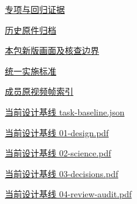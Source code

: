 \documentclass[11pt,a4paper]{article}
\begin{document}
\href{file:///D:/Agent/srp/agent/tasks/E-01/evidence/verification.json}{专项与回归证据}


\href{file:///D:/Agent/srp/agent/tasks/E-01/archive/README.md}{历史原件归档}


\href{file:///D:/Agent/srp/agent/tasks/E-01/outputs/current-implementation-evidence.md}{本包新版画面及核查边界}


\href{file:///D:/Agent/srp/agent/design/weather/2026-10-08_Storm\%E4\%B8\%8E\%E7\%BA\%AF\%E7\%B2\%92\%E5\%AD\%90\%E5\%8F\%8C\%E7\%8E\%AF\%E5\%AE\%9E\%E6\%96\%BD\%E6\%A0\%87\%E5\%87\%86.md}{统一实施标准}


\href{file:///D:/Agent/srp/human/assets/previews/2026-10-08/member-storm-particle-rings/frame-index.json}{成员原视频帧索引}


\href{file:///D:/Agent/srp/agent/design/design-foundation-20261008/task-baseline.json}{当前设计基线 task-\allowbreak{}baseline.json}


\href{file:///D:/Agent/srp/agent/design/design-foundation-20261008/01-design.pdf}{当前设计基线 01-\allowbreak{}design.pdf}


\href{file:///D:/Agent/srp/agent/design/design-foundation-20261008/02-science.pdf}{当前设计基线 02-\allowbreak{}science.pdf}


\href{file:///D:/Agent/srp/agent/design/design-foundation-20261008/03-decisions.pdf}{当前设计基线 03-\allowbreak{}decisions.pdf}


\href{file:///D:/Agent/srp/agent/design/design-foundation-20261008/04-review-audit.pdf}{当前设计基线 04-\allowbreak{}review-\allowbreak{}audit.pdf}
\end{document}
